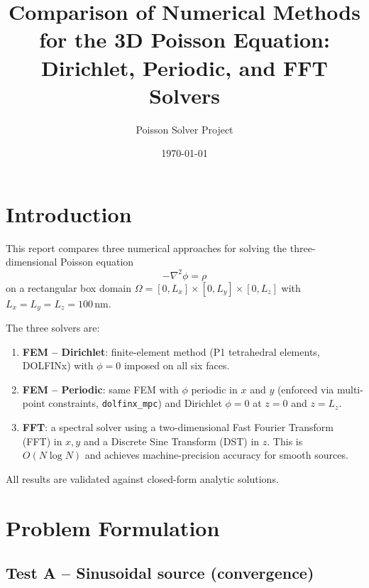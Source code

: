 \documentclass[11pt,a4paper]{article}
\title{Comparison of Numerical Methods for the 3D Poisson Equation:\\
        Dirichlet, Periodic, and FFT Solvers}
\author{Poisson Solver Project}
\date{\today}
\begin{document}
\maketitle
\tableofcontents
\newpage

\section{Introduction}

This report compares three numerical approaches for solving the three-dimensional
Poisson equation
\begin{equation}
  -\nabla^2 \phi = \rho
  \label{eq:poisson}
\end{equation}
on a rectangular box domain
$\Omega = [0, L_x] \times [0, L_y] \times [0, L_z]$
with $L_x = L_y = L_z = 100$\,nm.

The three solvers are:
\begin{enumerate}
  \item \textbf{FEM -- Dirichlet}: finite-element method (P1 tetrahedral
        elements, DOLFINx) with $\phi = 0$ imposed on all six faces.
  \item \textbf{FEM -- Periodic}: same FEM with $\phi$ periodic in $x$ and
        $y$ (enforced via multi-point constraints, \texttt{dolfinx\_mpc})
        and Dirichlet $\phi=0$ at $z=0$ and $z=L_z$.
  \item \textbf{FFT}: a spectral solver using a two-dimensional Fast Fourier
        Transform (FFT) in $x,y$ and a Discrete Sine Transform (DST) in $z$.
        This is $O(N \log N)$ and achieves machine-precision accuracy for
        smooth sources.
\end{enumerate}

All results are validated against closed-form analytic solutions.

\section{Problem Formulation}

\subsection{Test A -- Sinusoidal source (convergence)}
\end{document}
